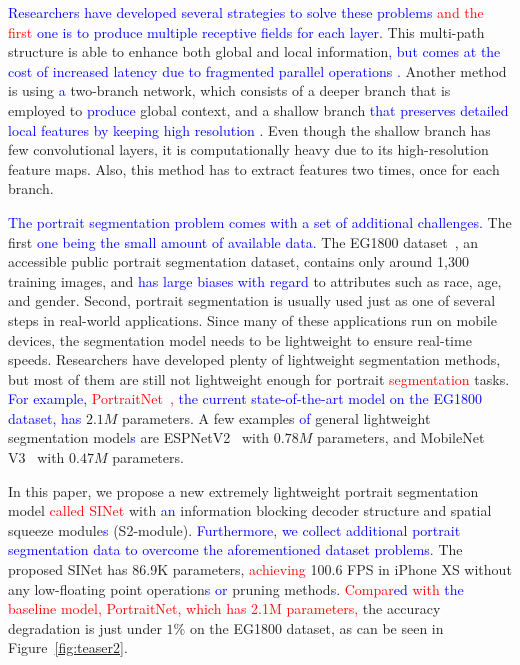 \documentclass[10pt,twocolumn,letterpaper]{article}
\newcommand\Lars[1]{\textcolor{blue}{#1}}
\newcommand\nj[1]{\textcolor{red}{#1}}
\newcommand\Lars[1]{#1}
\newcommand\nj[1]{#1}
\begin{document}
\Lars{Researchers have developed several strategies to solve these problems}
\nj{and the first}
\Lars{one is to produce multiple receptive fields for each layer.} 
This multi-path structure is able to enhance both global and local information\Lars{, but comes at the cost of increased latency due to fragmented parallel operations \cite{ma2018shufflenet}. }Another method is using \Lars{a} two-branch network, which consists of a deeper branch that is employed to \Lars{produce} global context, and a shallow branch \Lars{that preserves detailed local features by keeping high resolution} \cite{poudel2018contextnet, poudel2019fast, yu2018bisenet}.
Even though the shallow branch has few convolutional layers, it is computationally heavy due to its high-resolution feature maps.
Also, this method has to extract features two times, once for each branch.

\Lars{The portrait segmentation problem comes with a set of additional challenges.}
The first \Lars{one being the small amount of available data.} The EG1800 dataset~\cite{shen2016automatic}, an accessible public portrait segmentation dataset, contains only around 1,300 training images, and \Lars{has large biases with regard }to attributes such as race, age, and gender. 
Second, portrait segmentation is usually used just as one of several steps in real-world applications. 
Since many of these applications run on mobile devices, the segmentation model needs to be lightweight to ensure real-time speeds.
Researchers have developed plenty of lightweight segmentation methods, but most of them are still not lightweight enough for portrait \nj{segmentation} tasks. \Lars{For example, \nj{PortraitNet~\cite{zhang2019portraitnet},} the current state-of-the-art model on the EG1800 dataset, has} $2.1 M$ parameters. A few examples \Lars{of} general lightweight segmentation model\Lars{s} are ESPNetV2~\cite{mehta2018espnetv2} with $0.78M$ parameters, and MobileNet V3~\cite{howard2019searching} with $0.47M$ parameters. 



 In this paper, we propose a new extremely lightweight portrait segmentation model \nj{called SINet} with \Lars{an} information blocking decoder structure and spatial squeeze module\Lars{s} (S2-module).
\Lars{Furthermore, we collect additional portrait segmentation data to overcome the aforementioned dataset problems. }
The proposed SINet has 86.9K parameters, \nj{achieving} 100.6 FPS in iPhone XS without any low-floating point operation\Lars{s or} pruning method\Lars{s}. 
\nj{Compar\Lars{ed} with \Lars{the} baseline model, PortraitNet, which has 2.1M parameters,} the accuracy degradation is just under $1\%$ on the EG1800 dataset, as can be seen in Figure~\ref{fig:teaser2}.
\end{document}
